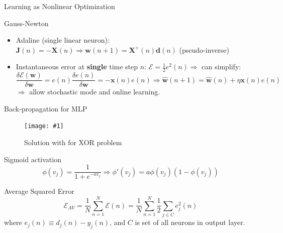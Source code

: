 \documentclass[9pt,t]{beamer}
\newcommand{\picHereWidth}[4] { %
    \begin{figure}[htp] %
        \centering
        \texttt{[image: \#1]} %
        \caption{#2} %
        \label{#3}
    \end{figure} %
}
\begin{document}
\begin{frame}{Learning as Nonlinear Optimization}
    \begin{alertblock}{Gauss-Newton}
        \begin{itemize}
            \item Adaline (single linear neuron): $ \mathbf{J}(n) = -\mathbf{X}(n) \Rightarrow \mathbf{w}(n+1) = \mathbf{X}^+(n)\mathbf{d}(n) $ (pseudo-inverse)
            \item Instantaneous error at \textbf{single} time step $ n $: $ \mathcal{E} = \frac{1}{2} e^2(n) \Rightarrow $ can simplify:
            \[ \frac{\delta \mathbf{\mathcal{E}}(\mathbf{w})}{\delta\mathbf{w}} = e(n)\frac{\delta e(n)}{\delta\mathbf{w}} = -\mathbf{x}(n)e(n) \Rightarrow \mathbf{\hat{w}}(n+1) = \mathbf{\hat{w}}(n) + \eta \mathbf{x}(n)e(n) \]
            $ \Rightarrow $ allow stochastic mode and online learning.
        \end{itemize}
    \end{alertblock}
\end{frame}

\begin{frame}{Back-propagation for MLP}
    \picHereWidth{mlp_xor}{Solution with for XOR problem}{fig:mlp_xor}{0.4\linewidth}
    \begin{alertblock}{Sigmoid activation}
        \[ \phi(v_j) = \frac{1}{1 + e^{-av_j}} \Rightarrow \phi'(v_j) = a \phi(v_j)(1 - \phi(v_j)) \]
    \end{alertblock}
    \begin{alertblock}{Average Squared Error}
        \[ \mathbf{\mathcal{E}}_{AV} = \frac{1}{N}\sum_{n=1}^{N}\mathbf{\mathcal{E}}(n) = \frac{1}{N}\sum_{n=1}^{N} \frac{1}{2} \sum_{j \in C} e_j^2(n) \]
        where $ e_j(n) \equiv d_j(n) - y_j(n) $, and $ C $ is set of all neurons in output layer.
    \end{alertblock}
\end{frame}
\end{document}
